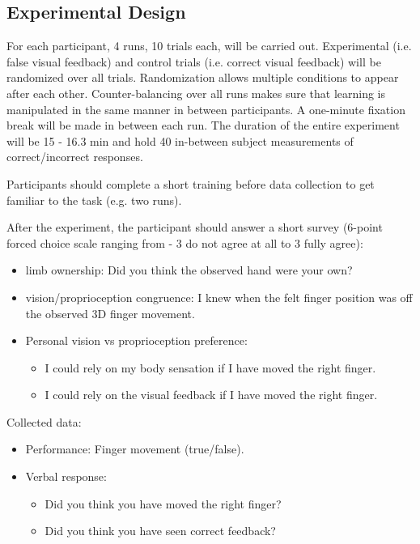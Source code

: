 \documentclass[man]{apa7}
\begin{document}
\subsection{Experimental Design}

For each participant, 4 runs, 10 trials each, will be carried out. Experimental (i.e. false visual feedback) and control trials (i.e. correct visual feedback) will be randomized over all trials. Randomization allows multiple conditions to appear after each other. Counter-balancing over all runs makes sure that learning is manipulated in the same manner in between participants. A one-minute fixation break will be made in between each run. The duration of the entire experiment will be 15 - 16.3 min and hold 40 in-between subject measurements of correct/incorrect responses.

Participants should complete a short training before data collection to get familiar to the task (e.g. two runs).

After the experiment, the participant should answer a short survey (6-point forced choice scale ranging from - 3 do not agree at all to 3 fully agree):
\begin{itemize}
    \item limb ownership: Did you think the observed hand were your own?
    \item vision/proprioception congruence: I knew when the felt finger position was off the observed 3D finger movement.
    \item Personal vision vs proprioception preference:
    \begin{itemize}
        \item I could rely on my body sensation if I have moved the right finger.
        \item I could rely on the visual feedback if I have moved the right finger.
    \end{itemize}
\end{itemize}


Collected data:
\begin{itemize}
    \item Performance: Finger movement (true/false).
    \item Verbal response:
    \begin{itemize}
        \item Did you think you have moved the right finger?
        \item Did you think you have seen correct feedback?
    \end{itemize}
\end{itemize} 
\end{document}

